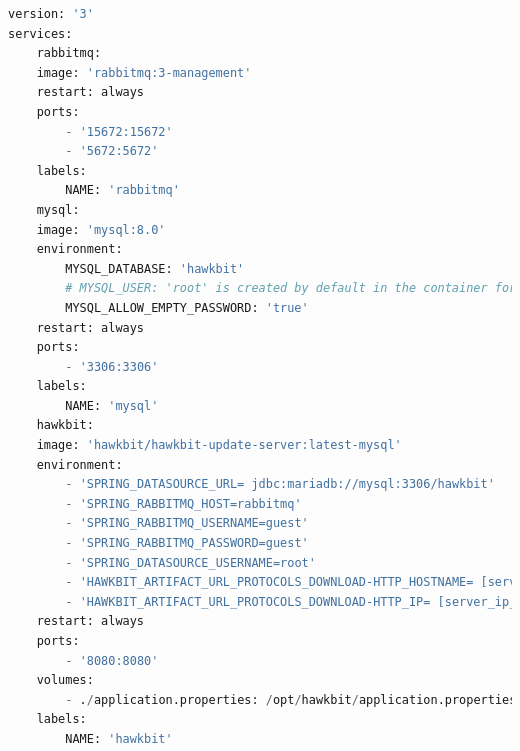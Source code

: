 \begin{lstlisting}[language=Python, caption={\textit{Hawkbit} server \textit{Docker} compose}, label=lst:AWSEC2DockerCompose]
version: '3'
services:
    rabbitmq:
    image: 'rabbitmq:3-management'
    restart: always
    ports:
        - '15672:15672'
        - '5672:5672'
    labels:
        NAME: 'rabbitmq'
    mysql:
    image: 'mysql:8.0'
    environment:
        MYSQL_DATABASE: 'hawkbit'
        # MYSQL_USER: 'root' is created by default in the container for mysql 8.0+
        MYSQL_ALLOW_EMPTY_PASSWORD: 'true'
    restart: always
    ports:
        - '3306:3306'
    labels:
        NAME: 'mysql'
    hawkbit:
    image: 'hawkbit/hawkbit-update-server:latest-mysql'
    environment:
        - 'SPRING_DATASOURCE_URL= jdbc:mariadb://mysql:3306/hawkbit'
        - 'SPRING_RABBITMQ_HOST=rabbitmq'
        - 'SPRING_RABBITMQ_USERNAME=guest'
        - 'SPRING_RABBITMQ_PASSWORD=guest'
        - 'SPRING_DATASOURCE_USERNAME=root'
        - 'HAWKBIT_ARTIFACT_URL_PROTOCOLS_DOWNLOAD-HTTP_HOSTNAME= [server_ip_address]'
        - 'HAWKBIT_ARTIFACT_URL_PROTOCOLS_DOWNLOAD-HTTP_IP= [server_ip_address]'
    restart: always
    ports:
        - '8080:8080'
    volumes:
        - ./application.properties: /opt/hawkbit/application.properties
    labels:
        NAME: 'hawkbit'
    \end{lstlisting}

